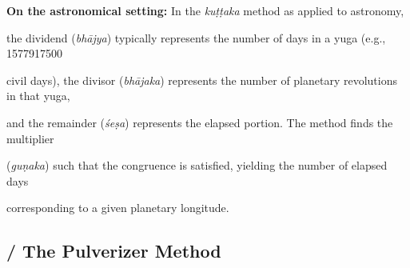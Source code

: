 \documentclass[10pt,a4paper]{article}
\newenvironment{engcommentary}
\newcommand{\bilingualverse}[2]{%

\noindent\begin{minipage}[t]{0.47\textwidth}

\dev{#1}

\end{minipage}%

\hfill\vline\hfill%

\begin{minipage}[t]{0.47\textwidth}

#2

\end{minipage}\par\vspace{0.8em}%

}
\begin{document}
\begin{engcommentary}

\textbf{On the astronomical setting:} In the \textit{kuṭṭaka} method as applied to astronomy,

the dividend (\textit{bhājya}) typically represents the number of days in a yuga (e.g., 1577917500

civil days), the divisor (\textit{bhājaka}) represents the number of planetary revolutions in that yuga,

and the remainder (\textit{śeṣa}) represents the elapsed portion. The method finds the multiplier

(\textit{guṇaka}) such that the congruence is satisfied, yielding the number of elapsed days

corresponding to a given planetary longitude.

\end{engcommentary}



\subsection*{ / The Pulverizer Method}



\end{document}
